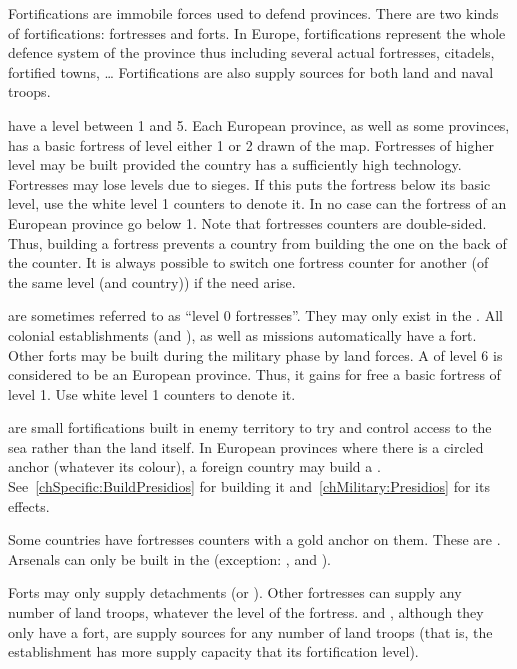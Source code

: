 \aparag Fortifications are immobile forces used to defend provinces. There are
two kinds of fortifications: fortresses and forts. In Europe, fortifications
represent the whole defence system of the province thus including several
actual fortresses, citadels, fortified towns, \ldots
\bparag Fortifications are also supply sources for both land and naval troops.

\aparag[Fortresses] have a level between 1 and 5.
\bparag Each European province, as well as some \ROTW provinces, has a basic
fortress of level either 1 or 2 drawn of the map.
\bparag Fortresses of higher level may be built provided the country has a
sufficiently high technology.
\bparag Fortresses may lose levels due to sieges. If this puts the fortress
below its basic level, use the white level 1 counters to denote it. In no case
can the fortress of an European province go below 1.
\bparag Note that fortresses counters are double-sided. Thus, building a
fortress prevents a country from building the one on the back of the
counter. It is always possible to switch one fortress counter for another (of
the same level (and country)) if the need arise.

\aparag[Forts] are sometimes referred to as ``level 0 fortresses''. They may
only exist in the \ROTW.
\bparag All colonial establishments (\COL and \TP), as well as missions
automatically have a fort.
\bparag Other forts may be built during the military phase by land forces.
\bparag A \COL of level 6 is considered to be an European province. Thus, it
gains for free a basic fortress of level 1. Use white level 1 counters to
denote it.

\aparag[\Presidios] are small fortifications built in enemy territory to try
and control access to the sea rather than the land itself.
\bparag In European provinces where there is a circled anchor (whatever its
colour), a foreign country may build a
\Presidio. See~\ref{chSpecific:BuildPresidios} for building it
and~\ref{chMilitary:Presidios} for its effects.

\aparag[Arsenals.] Some countries have fortresses counters with a gold anchor
on them. These are .
\bparag Arsenals can only be built in the \ROTW (exception:
,  and
).

\bparag Forts may only supply detachments (\LD or \LDE).
\bparag Other fortresses can supply any number of land troops, whatever the
level of the fortress.
\bparag \COL and \TP, although they only have a fort, are supply sources for
any number of land troops (that is, the establishment has more supply capacity
that its fortification level).

